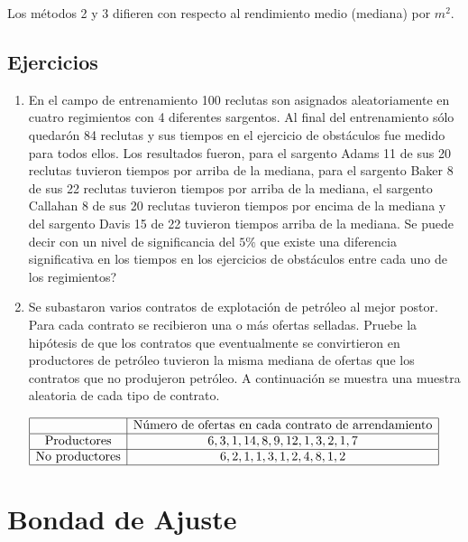 \documentclass[
  a4paper,
  oneside,
  openany]{book}
\begin{document}
Los métodos 2 y 3 difieren con respecto al rendimiento medio (mediana) por \(m^2\).

\hypertarget{ejercicios-7}{%
\section{Ejercicios}\label{ejercicios-7}}

\begin{enumerate}
\def\labelenumi{\arabic{enumi}.}
\item
  En el campo de entrenamiento 100 reclutas son asignados aleatoriamente en cuatro regimientos con 4 diferentes sargentos. Al final del entrenamiento sólo quedarón 84 reclutas y sus tiempos en el ejercicio de obstáculos fue medido para todos ellos. Los resultados fueron, para el sargento Adams 11 de sus 20 reclutas tuvieron tiempos por arriba de la mediana, para el sargento Baker 8 de sus 22 reclutas tuvieron tiempos por arriba de la mediana, el sargento Callahan 8 de sus 20 reclutas tuvieron tiempos por encima de la mediana y del sargento Davis 15 de 22 tuvieron tiempos arriba de la mediana. Se puede decir con un nivel de significancia del \(5\%\) que existe una diferencia significativa en los tiempos en los ejercicios de obstáculos entre cada uno de los regimientos?
\item
  Se subastaron varios contratos de explotación de petróleo al mejor postor. Para cada contrato se recibieron una o más ofertas selladas. Pruebe la hipótesis de que los contratos que eventualmente se convirtieron en productores de petróleo tuvieron la misma mediana de ofertas que los contratos que no produjeron petróleo. A continuación se muestra una muestra aleatoria de cada tipo de contrato.
\end{enumerate}

\[
\begin{array}{|c | c |}
\hline
&\mbox{Número de ofertas en cada contrato de arrendamiento} \\
   \hline
\mbox{Productores}& 6, 3, 1, 14, 8, 9, 12, 1, 3, 2, 1, 7  \\
  \hline
\mbox{No  productores}&6, 2, 1, 1, 3, 1, 2, 4, 8, 1, 2\\
    \hline
\end{array}
\]

\hypertarget{bondad-de-ajuste}{%
\chapter*{Bondad de Ajuste}\label{bondad-de-ajuste}}
\end{document}
